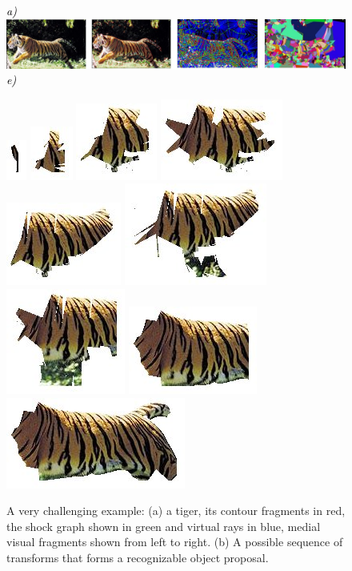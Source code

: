 \begin{figure}[ht]
  {\footnotesize\textit{\textcolor{black}{a)}}} \includegraphics[height=0.145\linewidth]{figs/tiger-fragments.jpg}
{\footnotesize\textit{\textcolor{black}{e)}}} \centerline{
  \includegraphics[width=.025\textwidth]{figs/tiger1_f.jpg}
  \includegraphics[width=.05\textwidth]{figs/tiger2_f.jpg}
  \includegraphics[width=.075\textwidth]{figs/tiger3_f.jpg}
  \includegraphics[width=.1\textwidth]{figs/tiger4_f.jpg}
  \includegraphics[width=.1\textwidth]{figs/tiger5_f.jpg}
  \includegraphics[width=.1\textwidth]{figs/tiger6_f.jpg}
  \includegraphics[width=.08\textwidth]{figs/tiger7_f.jpg}
  \includegraphics[width=.1\textwidth]{figs/tiger8_f.jpg}
  \includegraphics[width=.12\textwidth]{figs/tiger10_f.jpg}
  }
\caption{A very challenging example: (a) a tiger, its contour fragments in red, the shock graph shown in green and virtual rays in blue, medial visual fragments shown from left to right. (b) A possible sequence of transforms that forms a recognizable object proposal.}
   \label{fig:tiger_seq}
\end{figure}

